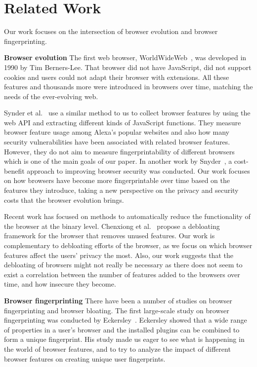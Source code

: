 \section{Related Work}
\label{sec:related-work}

Our work focuses on the intersection of browser evolution and browser
fingerprinting.

\textbf{Browser evolution} The first web browser,
WorldWideWeb~\cite{WorldWideWeb}, was developed in 1990 by Tim
Berners-Lee. That browser did not have JavaScript, did not support
cookies and users could not adapt their browser with extensions. All
these features and thousands more were introduced in browsers over
time, matching the needs of the ever-evolving web.

Synder et al.~\cite{snyder-imc16} use a similar method to us to
collect browser features by using the web API and extracting different
kinds of JavaScript functions. They measure browser feature usage
among Alexa's popular websites and also how many security
vulnerabilities have been associated with related browser
features. However, they do not aim to measure fingerprintability of
different browsers which is one of the main goals of our paper. In
another work by Snyder~\cite{snyder2017most}, a cost-benefit approach
to improving browser security was conducted.  Our work focuses on how
browsers have become more fingerprintable over time based on the
features they introduce, taking a new perspective on the privacy and
security costs that the browser evolution brings.

Recent work has focused on methods to automatically reduce the
functionality of the browser at the binary level. Chenxiong et
al.~\cite{slimium-ccs2020} propose a debloating framework for the
browser that removes unused features. Our work is complementary to
debloating efforts of the browser, as we focus on which browser
features affect the users' privacy the most. Also, our work suggests that
the debloating of browsers might not really be necessary as there does
not seem to exist a correlation between the number of features added
to the browsers over time, and how insecure they become.

\textbf{Browser fingerprinting} There have been a number of studies on
browser fingerprinting and browser bloating. The first large-scale
study on browser fingerprinting was conducted by
Eckersley~\cite{Eckersley}. Eckersley showed that a wide range of
properties in a user's browser and the installed plugins can be
combined to form a unique fingerprint. His study made us eager to see
what is happening in the world of browser features, and to try to
analyze the impact of different browser features on creating unique
user fingerprints.

